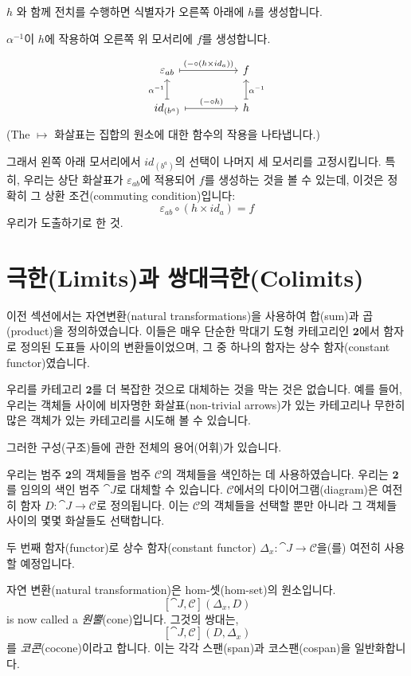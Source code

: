 \documentclass[DaoFP]{subfiles}
\begin{document}
$h$ 와 함께 전치를 수행하면 식별자가 오른쪽 아래에 $h$를 생성합니다.

$\alpha^{-1}$이 $h$에 작용하여 오른쪽 위 모서리에 $f$를 생성합니다.

\[
 \begin{tikzcd}[
  every arrow/.style={draw,mapsto}
]
 \varepsilon_{a b}
 \arrow[rr, "(- \circ (h \times id_a))"]
& &
f
 \\
 id_{(b^a)}
 \arrow[u, "\alpha^{-1}"]
 \arrow[rr, "(- \circ h)"]
& &
h
\arrow[u, "\alpha^{-1}"']
 \end{tikzcd}
\]
(The $\mapsto$ 화살표는 집합의 원소에 대한 함수의 작용을 나타냅니다.)


그래서 왼쪽 아래 모서리에서 $id_{(b^a)}$의 선택이 나머지 세 모서리를 고정시킵니다. 특히, 우리는 상단 화살표가 $\varepsilon_{a b}$에 적용되어 $f$를 생성하는 것을 볼 수 있는데, 이것은 정확히 그 상환 조건(commuting condition)입니다:
\[ \varepsilon_{a b} \circ (h \times id_a) = f \]
우리가 도출하기로 한 것.

\section{극한(Limits)과 쌍대극한(Colimits)}

이전 섹션에서는 자연변환(natural transformations)을 사용하여 합(sum)과 곱(product)을 정의하였습니다. 이들은 매우 단순한 막대기 도형 카테고리인 $\mathbf{2}$에서 함자로 정의된 도표들 사이의 변환들이었으며, 그 중 하나의 함자는 상수 함자(constant functor)였습니다.

우리를 카테고리 $\mathbf{2}$를 더 복잡한 것으로 대체하는 것을 막는 것은 없습니다. 예를 들어, 우리는 객체들 사이에 비자명한 화살표(non-trivial arrows)가 있는 카테고리나 무한히 많은 객체가 있는 카테고리를 시도해 볼 수 있습니다.

그러한 구성(구조)들에 관한 전체의 용어(어휘)가 있습니다.

우리는 범주 $\mathbf{2}$의 객체들을 범주 $\mathcal{C}$의 객체들을 색인하는 데 사용하였습니다. 우리는 $\mathbf{2}$를 임의의 색인 범주 $\cat J$로 대체할 수 있습니다. $\mathcal{C}$에서의 다이어그램(diagram)은 여전히 함자 $D \colon \cat J \to \mathcal{C}$로 정의됩니다. 이는 $\mathcal{C}$의 객체들을 선택할 뿐만 아니라 그 객체들 사이의 몇몇 화살들도 선택합니다.

두 번째 함자(functor)로 상수 함자(constant functor) $\Delta_x \colon \cat J \to \mathcal{C}$을(를) 여전히 사용할 예정입니다.

자연 변환(natural transformation)은 hom-셋(hom-set)의 원소입니다.
\[ [\cat J, \mathcal{C}](\Delta_x, D)  \]
is now called a \emph{원뿔}(cone)입니다. 그것의 쌍대는,
\[ [\cat J, \mathcal{C}](D, \Delta_x)  \]
를 \emph{코콘}(cocone)이라고 합니다. 이는 각각 스팬(span)과 코스팬(cospan)을 일반화합니다.
\end{document}

